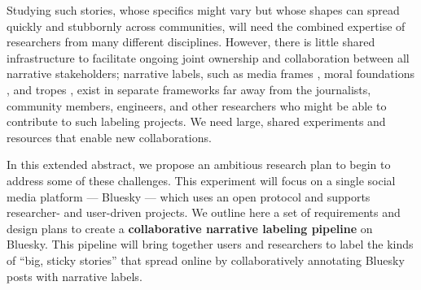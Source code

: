 \documentclass{article} %
\begin{document}
Studying such stories, whose specifics might vary but whose shapes can spread quickly and stubbornly across communities, will need the combined expertise of researchers from many different disciplines.
However, there is little shared infrastructure to facilitate ongoing joint ownership and collaboration between all narrative stakeholders; narrative labels, such as media frames \citep{card2015media}, moral foundations \citep{graham2013moral}, and tropes \citep{DBLP:conf/emnlp/0001ABYBA24}, exist in separate frameworks far away from the journalists, community members, engineers, and other researchers who might be able to contribute to such labeling projects. 
We need large, shared experiments and resources that enable new collaborations.

In this extended abstract, we propose an ambitious research plan to begin to address some of these challenges.
This experiment will focus on a single social media platform --- Bluesky --- which uses an open protocol and supports researcher- and user-driven projects. 
We outline here a set of requirements and design plans to create a \textbf{collaborative narrative labeling pipeline} on Bluesky.
This pipeline will bring together users and researchers to label the kinds of ``big, sticky stories'' that spread online by collaboratively annotating Bluesky posts with narrative labels.



\end{document}

